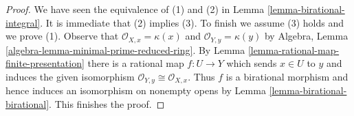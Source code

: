 \documentclass[10pt,a4paper]{amsart}
\theoremstyle{plain}
\theoremstyle{definition}
\theoremstyle{remark}
\numberwithin{equation}{subsection}
\begin{document}
\begin{proof}
We have seen the equivalence of (1) and (2) in
Lemma \ref{lemma-birational-integral}.
It is immediate that (2) implies (3).
To finish we assume (3) holds and we prove (1).
Observe that $\mathcal{O}_{X, x} = \kappa(x)$ and
$\mathcal{O}_{Y, y} = \kappa(y)$ by
Algebra, Lemma \ref{algebra-lemma-minimal-prime-reduced-ring}.
By Lemma \ref{lemma-rational-map-finite-presentation}
there is a rational map $f : U \to Y$
which sends $x \in U$ to $y$ and induces
the given isomorphism $\mathcal{O}_{Y, y} \cong \mathcal{O}_{X, x}$.
Thus $f$ is a birational morphism and hence induces
an isomorphism on nonempty opens
by Lemma \ref{lemma-birational-birational}.
This finishes the proof.
\end{proof}
\end{document}
